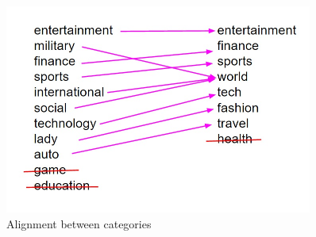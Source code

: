 \begin{figure}[ht]
    \centering
    \includegraphics[width=0.9\textwidth]{wsd_4.jpg}
    \caption{Alignment between categories}
    \label{fig:wsd_4}
\end{figure}

